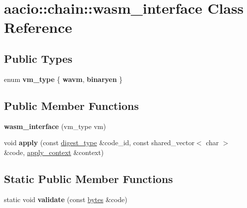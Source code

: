 \hypertarget{classaacio_1_1chain_1_1wasm__interface}{}\section{aacio\+:\+:chain\+:\+:wasm\+\_\+interface Class Reference}
\label{classaacio_1_1chain_1_1wasm__interface}
\subsection*{Public Types}
\begin{DoxyCompactItemize}
\item 
\mbox{\label{classaacio_1_1chain_1_1wasm__interface_a8a419707b3a1a80096a8333706f53bbe}} 
enum {\bfseries vm\+\_\+type} \{ {\bfseries wavm}, 
{\bfseries binaryen}
 \}
\end{DoxyCompactItemize}
\subsection*{Public Member Functions}
\begin{DoxyCompactItemize}
\item 
\mbox{\label{classaacio_1_1chain_1_1wasm__interface_a725ea2ccab19029c70aa8c80a4aa9d41}} 
{\bfseries wasm\+\_\+interface} (vm\+\_\+type vm)
\item 
\mbox{\label{classaacio_1_1chain_1_1wasm__interface_a0f214fcf3ba48b29786afde0248ee2c7}} 
void {\bfseries apply} (const \mbox{\hyperlink{classfc_1_1sha256}{digest\+\_\+type}} \&code\+\_\+id, const shared\+\_\+vector$<$ char $>$ \&code, \mbox{\hyperlink{classaacio_1_1chain_1_1apply__context}{apply\+\_\+context}} \&context)
\end{DoxyCompactItemize}
\subsection*{Static Public Member Functions}
\begin{DoxyCompactItemize}
\item 
\mbox{\label{classaacio_1_1chain_1_1wasm__interface_a0d676bca03a6f7140fc62f1b6af1e1ed}} 
static void {\bfseries validate} (const \mbox{\hyperlink{classstd_1_1vector}{bytes}} \&code)
\end{DoxyCompactItemize}
